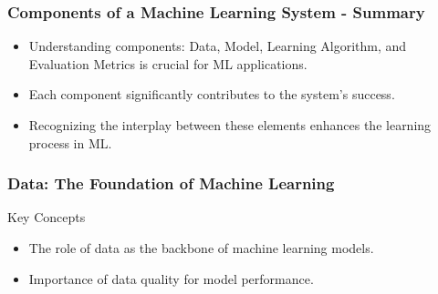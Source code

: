 \documentclass[aspectratio=169]{beamer}
\begin{document}
\begin{frame}[fragile]
    \frametitle{Components of a Machine Learning System - Summary}
    \begin{itemize}
        \item Understanding components: Data, Model, Learning Algorithm, and Evaluation Metrics is crucial for ML applications.
        \item Each component significantly contributes to the system's success.
        \item Recognizing the interplay between these elements enhances the learning process in ML.
    \end{itemize}
\end{frame}

\begin{frame}[fragile]
    \frametitle{Data: The Foundation of Machine Learning}
    
    \begin{block}{Key Concepts}
        \begin{itemize}
            \item The role of data as the backbone of machine learning models.
            \item Importance of data quality for model performance.
        \end{itemize}
    \end{block}

\end{frame}
\end{document}
